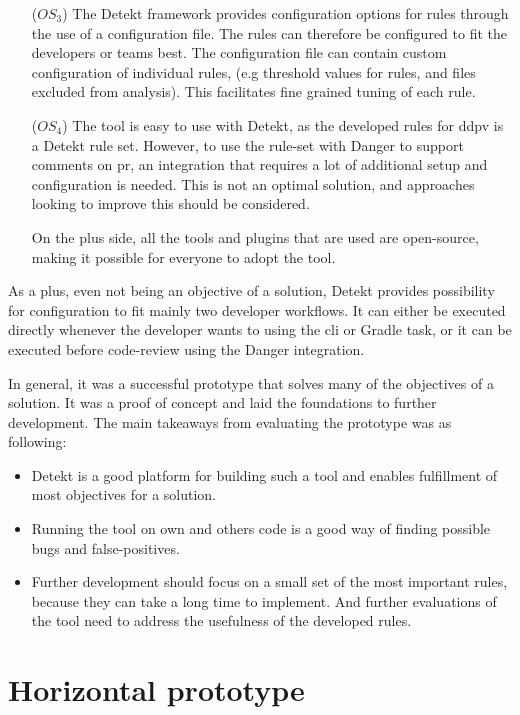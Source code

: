 \documentclass[pdftex,10pt,b5paper,twoside]{report}
\begin{document}
\begin{itemize}
    \item [(\(OS_{3}\))] The Detekt framework provides configuration options for rules through the use of a configuration file. The rules can therefore be configured to fit the developers or teams best. The configuration file can contain custom configuration of individual rules, (e.g threshold values for rules, and files excluded from analysis). This facilitates fine grained tuning of each rule.  \label{vertical-os3}
    
    \item [(\(OS_{4}\))] The tool is easy to use with Detekt, as the developed rules for \gls{ddpv} is a Detekt rule set. However, to use the rule-set with Danger to support comments on \gls{pr}, an integration that requires a lot of additional setup and configuration is needed. This is not an optimal solution, and approaches looking to improve this should be considered. 
    
    On the plus side, all the tools and plugins that are used are open-source, making it possible for everyone to adopt the tool. \label{vertical-os4}

\end{itemize}

As a plus, even not being an objective of a solution, Detekt provides possibility for configuration to fit mainly two developer workflows. It can either be executed directly whenever the developer wants to using the \gls{cli} or Gradle task, or it can be executed before code-review using the Danger integration.

In general, it was a successful prototype that solves many of the objectives of a solution. It was a proof of concept and laid the foundations to further development. The main takeaways from evaluating the prototype was as following:
\begin{itemize}
    \item Detekt is a good platform for building such a tool and enables fulfillment of most objectives for a solution.
    \item Running the tool on own and others code is a good way of finding possible bugs and false-positives.
    \item Further development should focus on a small set of the most important rules, because they can take a long time to implement. And further evaluations of the tool need to address the usefulness of the developed rules.
\end{itemize}

\section{Horizontal prototype}
\label{horizontal-prototype}
\end{document}
